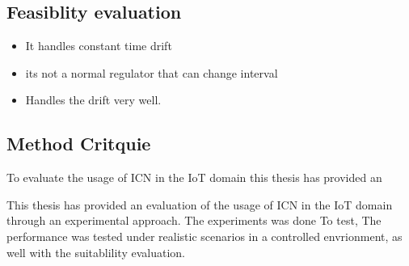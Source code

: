 \subsection{Feasiblity evaluation}
\begin{itemize}
\item It handles constant time drift
\item its not a normal regulator that can change interval
\item Handles the drift very well.
\end{itemize}

\subsection{Method Critquie}
To evaluate the usage of ICN in the IoT domain this thesis has provided an

This thesis has provided an evaluation of the usage of ICN in the IoT domain through an experimental approach. The experiments was done
To test, 
The performance was tested under realistic scenarios in a controlled envrionment, as well with the suitablility evaluation.


